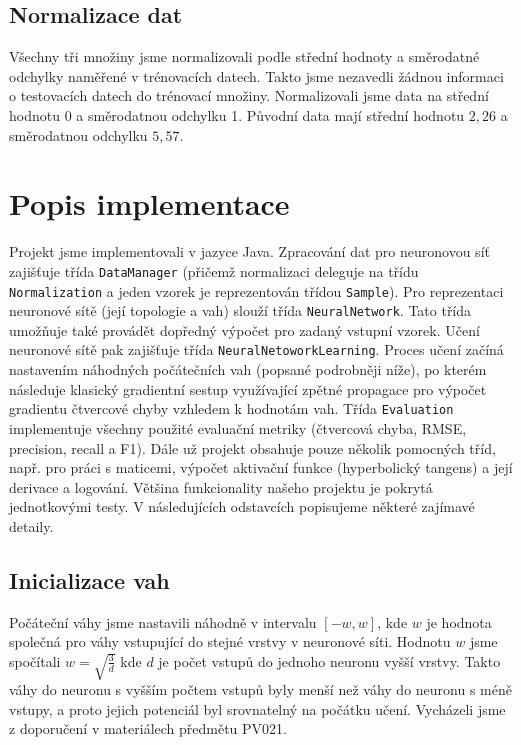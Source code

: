 \documentclass[a4paper, 10pt, twocolumn]{article}
\begin{document}
    \subsection{Normalizace dat}
        Všechny tři množiny jsme normalizovali podle střední hodnoty a směrodatné odchylky naměřené v trénovacích datech. Takto jsme nezavedli žádnou informaci o testovacích datech do trénovací množiny. Normalizovali jsme data na střední hodnotu 0 a směrodatnou odchylku 1. Původní data mají střední hodnotu $2,26$ a směrodatnou odchylku $5,57$.
\section{Popis implementace}
    Projekt jsme implementovali v jazyce Java.
    Zpracování dat pro neuronovou síť zajišťuje třída \texttt{DataManager} (přičemž normalizaci deleguje na třídu \texttt{Normalization} a jeden vzorek je reprezentován třídou \texttt{Sample}).
    Pro reprezentaci neuronové sítě (její topologie a vah) slouží třída \texttt{NeuralNetwork}. Tato třída umožňuje také provádět dopředný výpočet pro zadaný vstupní vzorek.
    Učení neuronové sítě pak zajišťuje třída \texttt{NeuralNetoworkLearning}. Proces učení začíná nastavením náhodných počátečních vah (popsané podrobněji níže), po kterém následuje klasický gradientní sestup využívající zpětné propagace pro výpočet gradientu čtvercové chyby vzhledem k hodnotám vah.
    Třída \texttt{Evaluation} implementuje všechny použité evaluační metriky (čtvercová chyba, RMSE, precision, recall a F1).
    Dále už projekt obsahuje pouze několik pomocných tříd, např. pro práci s maticemi, výpočet aktivační funkce (hyperbolický tangens) a její derivace a logování.
    Většina funkcionality našeho projektu je pokrytá jednotkovými testy.
    V následujících odstavcích popisujeme některé zajímavé detaily.

    \subsection{Inicializace vah}
      Počáteční váhy jsme nastavili náhodně v intervalu $[-w,w]$, kde $w$ je hodnota společná pro váhy vstupující do stejné vrstvy v neuronové síti. Hodnotu $w$ jsme spočítali $w = \sqrt{\frac{3}{d}}$ kde $d$ je počet vstupů do jednoho neuronu vyšší vrstvy. Takto váhy do neuronu s vyšším počtem vstupů byly menší než váhy do neuronu s méně vstupy, a proto jejich potenciál byl srovnatelný na počátku učení. Vycházeli jsme z doporučení v materiálech předmětu PV021.
\end{document}
